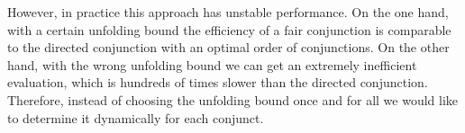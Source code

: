 However, in practice this approach has unstable performance. On the one hand, with a certain unfolding bound the efficiency of a fair conjunction is comparable to the directed conjunction
with an optimal order of conjunctions. On the other hand, with the wrong unfolding bound we can get an extremely inefficient evaluation, which is hundreds of times slower than the directed
conjunction. Therefore, instead of choosing the unfolding bound once and for all we would like to determine it dynamically for each conjunct.

